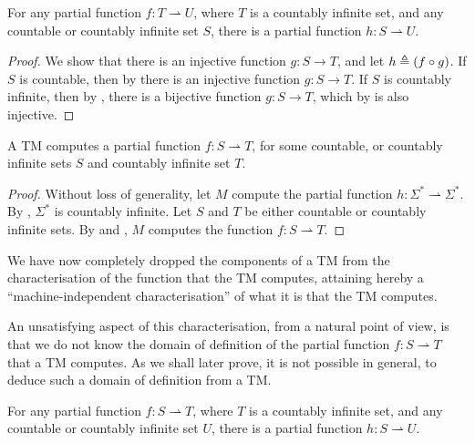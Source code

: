 \begin{lemma} \label{lem:tm-domain} For any partial function $f : T
\rightharpoonup U$, where $T$ is a countably infinite set, and any countable or
countably infinite set $S$, there is a partial function $h : S \rightharpoonup
U$. \end{lemma}

\begin{proof} We show that there is an injective function $g : S \rightarrow
T$, and let $h \triangleq \mathopen{}\left({f \circ g}\right)\mathclose{}$. If $S$ is countable, then by
 there is an injective function $g : S
\rightarrow T$. If $S$ is countably infinite, then by
, there is a bijective
function $g : S \rightarrow T$, which by  is also
injective.\end{proof}

\begin{theorem} \label{thm:tm-machine-independent} A TM computes a partial
function $f : S \rightharpoonup T$, for some countable, or countably infinite
sets $S$ and countably infinite set $T$. \end{theorem}

\begin{proof} Without loss of generality, let $M$ compute the partial function
$h : \Sigma^* \rightharpoonup \Sigma^*$. By
, $\Sigma^*$ is countably infinite. Let
$S$ and $T$ be either countable or countably infinite sets. By
 and , $M$ computes the function $f : S
\rightharpoonup T$. \end{proof}

\begin{remark} We have now completely dropped the components of a TM from the
characterisation of the function that the TM computes, attaining hereby a
``machine-independent characterisation'' of what it is that the TM computes.
\end{remark}

An unsatisfying aspect of this characterisation, from a natural point of view,
is that we do not know the domain of definition of the partial function $f : S
\rightharpoonup T$ that a TM computes. As we shall later prove, it is not
possible in general, to deduce such a domain of definition from a TM.

\begin{lemma} \label{lem:tm-codomain} For any partial function $f : S
\rightharpoonup T$, where $T$ is a countably infinite set, and any countable or
countably infinite set $U$, there is a partial function $h : S \rightharpoonup
U$. \end{lemma}

